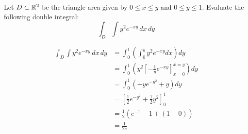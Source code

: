 \begin{exercise}
	Let $D \subset \mathbb{R}^2$ be the triangle area given by $0 \leq x \leq y$ and $0 \leq y \leq 1$. Evaluate the following double integral:
	$$
		\int_D \int y^2 e^{-xy} \, dx \, dy
	$$
\end{exercise}

\begin{solution}
	$$
		\begin{aligned}
			\int_D \int y^2 e^{-xy} \, dx \, dy & = \int_{0}^{1} \left( \int_{0}^{y} y^2 e^{-xy} dx \right) dy                         \\
			                                    & = \int_{0}^{1} \left( y^2 \left[ -\frac{1}{y} e^{-xy} \right]_{x=0}^{x=y} \right) dy \\
			                                    & = \int_{0}^{1} \left( -y e^{-y^2} + y \right) dy                                     \\
			                                    & = \left[ \tfrac{1}{2} e^{-y^2} + \tfrac{1}{2} y^2 \right]_{0}^{1}                    \\
			                                    & = \frac{1}{2} \left( e^{-1} - 1 + (1 - 0) \right)                                    \\
			                                    & = \frac{1}{2e}
		\end{aligned}
	$$
\end{solution}
